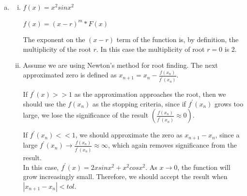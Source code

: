 \documentclass[11pt]{article}
\begin{document}
\begin{enumerate}
\begin{enumerate}[(a)]
		\newpage

		\item
		\begin{enumerate}[i.]
		\item $f(x) = x^2sinx^2$

		$f(x) = (x-r)^m*F(x)$

		The exponent on the $(x-r)$ term of the function is, by definition, the multiplicity of the root $r$. In this case
		the multiplicity of root $r = 0$ is 2.

		\item Assume we are using Newton's method for root finding. The next approximated zero is defined as $x_{n+1} =
			x_n - \frac{f(x_n)}{f^{'}(x_n)}$.

			If $f^{'}(x) >> 1$ as the approximation approaches the root, then we should
			use the $f(x_n)$ as the stopping criteria, since if $f^{'}(x_n)$ grows too large, we lose the significance of the
			result $(\frac{f(x_n)}{f^{'}(x_n)} \approx 0)$.

			If $f^{'}(x_n) << 1$, we should approximate the zero as $x_{n+1}-
			x_n$, since a large $f^{'}(x_n) \to \frac{f(x_n)}{f^{'}(x_n)} \approx \infty$, which again removes significance
			from the result. \\

			In this case, $f^{'}(x) = 2xsinx^2 + x^2cosx^2$. As $x\to0$, the function will grow increasingly small. Therefore,
			we should accept the result when $|x_{n+1} - x_n| < tol$. \\
		\end{enumerate}

	\end{enumerate}

\end{enumerate}
\end{document}
